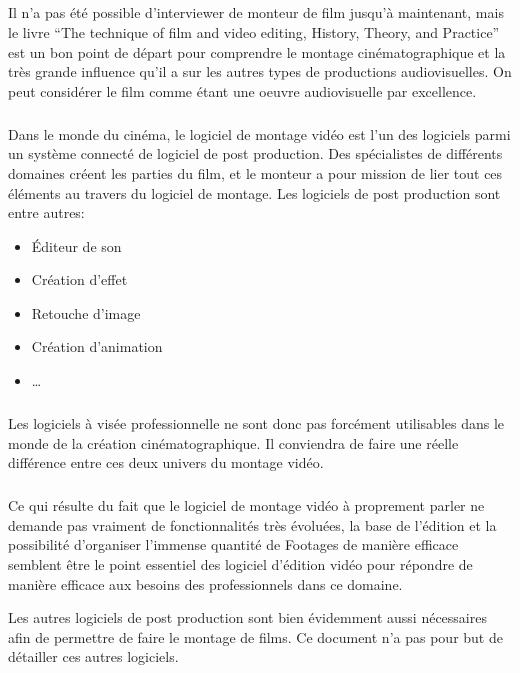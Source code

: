\subparagraph{}

Il n'a pas été possible d'interviewer de monteur de film jusqu'à
maintenant, mais le livre ``The technique of film and video editing,
History, Theory, and Practice'' \cite{TheTechniqueOfFilmAndVideoEditing}
est un bon point de départ pour comprendre le montage cinématographique
et la très grande influence qu'il a sur les autres types de productions
audiovisuelles. On peut considérer le film comme étant une oeuvre
audiovisuelle par excellence. %

\subparagraph{}

Dans le monde du cinéma, le logiciel de montage vidéo est l'un des
logiciels parmi un système connecté de logiciel de post production. Des
spécialistes de différents domaines créent les parties du film,
et le monteur a pour mission de lier tout ces éléments au travers du
logiciel de montage. Les logiciels de post production sont entre autres:

\begin{itemize} \setlength{\itemsep}{2mm}

  \item{Éditeur de son}

  \item{Création d'effet}

  \item{Retouche d'image}

  \item{Création d'animation}

  \item{\ldots}

\end{itemize}

\subparagraph{}

Les logiciels à visée professionnelle ne sont donc pas forcément
utilisables dans le monde de la création cinématographique. Il
conviendra de faire une réelle différence entre ces deux univers du
montage vidéo.

\subparagraph{}

Ce qui résulte du fait que le logiciel de montage vidéo à proprement
parler ne demande pas vraiment de fonctionnalités très évoluées, la
base de l'édition et la possibilité d'organiser l'immense quantité
de Footages de manière efficace semblent être le point essentiel
des logiciel d'édition vidéo pour répondre de manière efficace aux
besoins des professionnels dans ce domaine.

Les autres logiciels de post production sont bien évidemment aussi
nécessaires afin de permettre de faire le montage de films. Ce document
n'a pas pour but de détailler ces autres logiciels.

